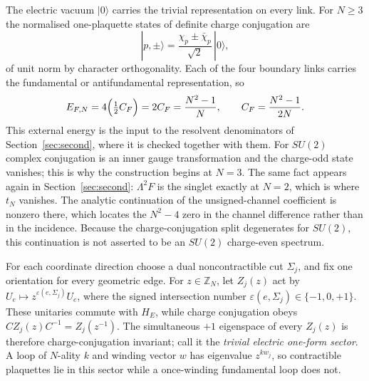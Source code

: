 \documentclass[11pt]{article}
\theoremstyle{plain}
\theoremstyle{definition}
\theoremstyle{remark}
\newcommand{\chk}[1]{}
\newcommand{\CF}{C_F}
\begin{document}
The electric vacuum $|0\rangle$ carries the trivial representation on every
link. For $N\ge3$ the normalised one-plaquette states of definite charge
conjugation are
\begin{equation}\label{eq:states}
  |p,\pm\rangle=\frac{\chi_p\pm\bar\chi_p}{\sqrt2}\,|0\rangle ,
\end{equation}
of unit norm by character orthogonality. Each of the four boundary links
carries the fundamental or antifundamental representation, so
\begin{equation}\label{eq:EF}
  E_{F,N}=4\Bigl(\tfrac12 \CF\Bigr)=2\CF=\frac{N^2-1}{N},
  \qquad \CF=\frac{N^2-1}{2N}.
\end{equation}
This external energy is the input to the resolvent denominators of
Section~\ref{sec:second}, where it is checked together with them.
For $SU(2)$ complex conjugation is an inner gauge transformation and the
charge-odd state vanishes; this is why the construction begins at $N=3$. The
same fact appears again in Section~\ref{sec:second}: $\Lambda^2F$ is the
singlet exactly at $N=2$, which is where $t_N$ vanishes. The analytic
continuation of the unsigned-channel coefficient is nonzero there, which
locates the $N^2-4$ zero in the channel difference rather than in the
incidence. Because the charge-conjugation split degenerates for $SU(2)$, this
continuation is not asserted to be an $SU(2)$ charge-even spectrum.
\chk{at N = 2 the C-odd hopping vanishes and the C-even one does not}

For each coordinate direction choose a dual noncontractible cut $\Sigma_j$,
and fix one orientation for every geometric edge. For $z\in\mathbb Z_N$, let
$Z_j(z)$ act by $U_e\mapsto z^{\varepsilon(e,\Sigma_j)}U_e$, where the signed
intersection number $\varepsilon(e,\Sigma_j)\in\{-1,0,+1\}$. These unitaries
commute with $H_E$, while charge conjugation obeys
$CZ_j(z)C^{-1}=Z_j(z^{-1})$. The simultaneous $+1$ eigenspace of every
$Z_j(z)$ is therefore charge-conjugation invariant; call it the
\emph{trivial electric one-form sector}. A loop of $N$-ality $k$ and winding
vector $w$ has eigenvalue $z^{k w_j}$, so contractible plaquettes lie in this
sector while a once-winding fundamental loop does not.
\end{document}
